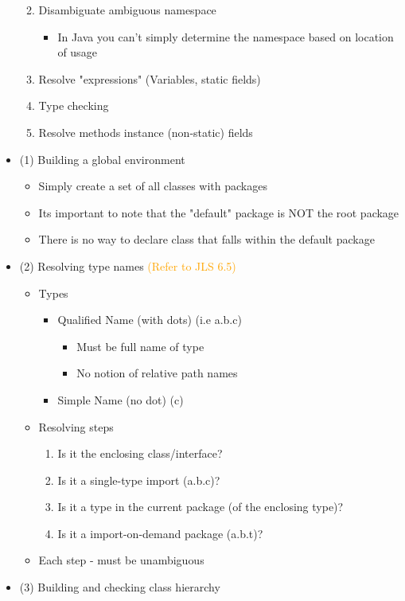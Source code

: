 \documentclass{article}
\newcommand*\circled[1]{\tikz[baseline=(char.base)]{
            \node[shape=circle,draw,inner sep=2pt] (char) {#1};}}
\begin{document}
\begin{itemize}
\begin{enumerate}
\color{red}
\item Disambiguate ambiguous namespace 
\begin{itemize}
\item In Java you can't simply determine the namespace based on location of usage
\end{itemize} 
\item Resolve "expressions" (Variables, static fields)
\item Type checking
\item Resolve methods instance (non-static) fields
\end{enumerate}
\item (1) Building a global environment 
\begin{itemize}
\item Simply create a set of all classes with packages
\item Its important to note that the "default" package is NOT the root package 
\item There is no way to declare class that falls within the default package
\end{itemize}
\item (2)  Resolving type names \textcolor{orange}{(Refer to JLS 6.5)}
\begin{itemize}
\item Types
\begin{itemize}
\item Qualified Name (with dots) (i.e a.b.c)
\begin{itemize}
\item Must be full name of type 
\item No notion of relative path names
\end{itemize}
\item Simple Name (no dot) (c)
\end{itemize}
\item Resolving steps
\begin{enumerate}
\item Is it the enclosing class/interface?
\item Is it a single-type import (a.b.c)?
\item Is it a type in the current package (of the enclosing type)?
\item Is it a import-on-demand package (a.b.t)?
\end{enumerate}
\item Each step \circled{1} - \circled{4} must be unambiguous
\end{itemize}
\newpage
\item (3) Building and checking class hierarchy

\end{itemize}
\end{document}
